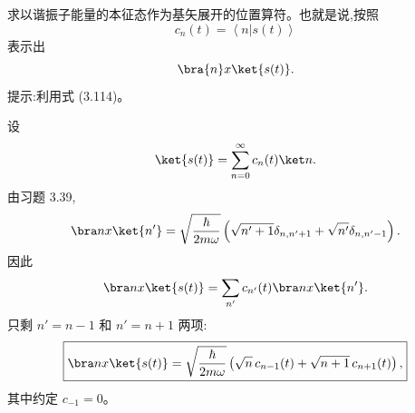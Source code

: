 \begin{question}
求以谐振子能量的本征态作为基矢展开的位置算符。也就是说,按照
\[
c_n(t)=\left\langle n|s(t) \right\rangle
\]
表示出
\[
\bra{n}x\ket{s(t)}.
\]
提示:利用式 (3.114)。

\par\smallskip
{}

\end{question}
\begin{solution}
设
\[
\ket{s(t)}=\sum_{n=0}^{\infty}c_n(t)\ket n.
\]
由习题 3.39,
\[
\bra n x\ket{n'}=\sqrt{\frac{\hbar}{2m\omega}}
\left(\sqrt{n'+1}\delta_{n,n'+1}+\sqrt{n'}\delta_{n,n'-1}\right).
\]
因此
\[
\bra n x\ket{s(t)}=\sum_{n'}c_{n'}(t)\bra n x\ket{n'}.
\]
只剩 $n'=n-1$ 和 $n'=n+1$ 两项:
\[
\boxed{\bra n x\ket{s(t)}=
\sqrt{\frac{\hbar}{2m\omega}}
\left(\sqrt n\,c_{n-1}(t)+\sqrt{n+1}\,c_{n+1}(t)\right),}
\]
其中约定 $c_{-1}=0$。
\end{solution}

